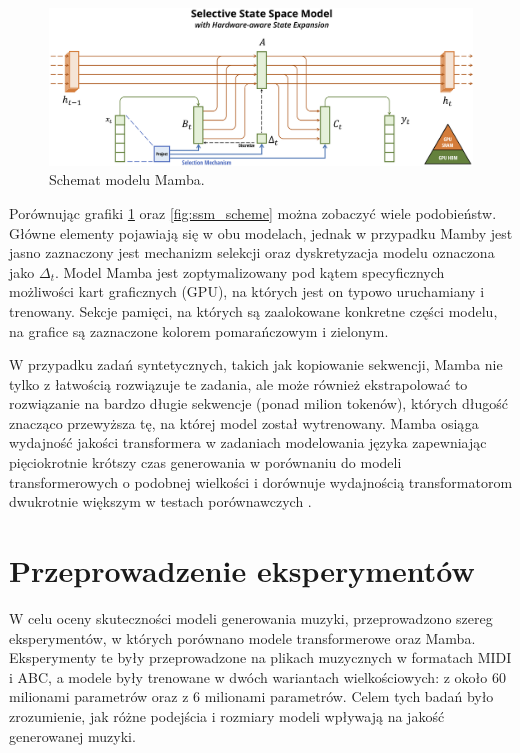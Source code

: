 \documentclass[data-science]{agh-wi} %
\begin{document}
\begin{figure}[ht!]
    \begin{center}
        \includegraphics[width=0.9\linewidth]{img/mamba1.png}
    \end{center}
    \caption{Schemat modelu Mamba.}
    \label{fig:mamba1}
\end{figure}

Porównując grafiki \ref*{fig:mamba1} oraz \ref*{fig:ssm_scheme} można zobaczyć wiele podobieństw. Główne elementy pojawiają się w obu modelach, jednak w przypadku Mamby jest jasno zaznaczony jest mechanizm selekcji oraz dyskretyzacja modelu oznaczona jako $\Delta_t$. Model Mamba jest zoptymalizowany pod kątem specyficznych możliwości kart graficznych (GPU), na których jest on typowo uruchamiany i trenowany. Sekcje pamięci, na których są zaalokowane konkretne części modelu, na grafice są zaznaczone kolorem pomarańczowym i zielonym.

W przypadku zadań syntetycznych, takich jak kopiowanie sekwencji, Mamba nie tylko z łatwością rozwiązuje te zadania, ale może również ekstrapolować to rozwiązanie na bardzo długie sekwencje (ponad milion tokenów), których długość znacząco przewyższa tę, na której model został wytrenowany. Mamba osiąga wydajność jakości transformera w zadaniach modelowania języka zapewniając pięciokrotnie krótszy czas generowania w porównaniu do modeli transformerowych o podobnej wielkości i dorównuje wydajnością transformatorom dwukrotnie większym w testach porównawczych \cite{mamba}.

\chapter{Przeprowadzenie eksperymentów}
W celu oceny skuteczności modeli generowania muzyki, przeprowadzono szereg eksperymentów, w których porównano modele transformerowe oraz Mamba. Eksperymenty te były przeprowadzone na plikach muzycznych w formatach MIDI i ABC, a modele były trenowane w dwóch wariantach wielkościowych: z około 60 milionami parametrów oraz z 6 milionami parametrów. Celem tych badań było zrozumienie, jak różne podejścia i rozmiary modeli wpływają na jakość generowanej muzyki.
\end{document}
